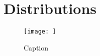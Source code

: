 \documentclass[../thesis.tex]{subfiles} %
\begin{document}
\section{Distributions}
\begin{figure}[H]
    \centering
    \texttt{[image: ]}
    \caption{Caption}
    \label{fig:my_label}
\end{figure}
\end{document}
